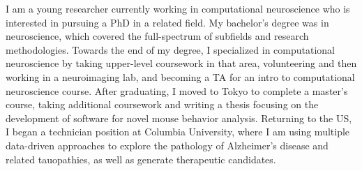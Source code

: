 %
%
%

\vspace*{-0.1cm}

\begin{cvparagraph}
    {I am a young researcher currently working in computational neuroscience who is
        interested in pursuing a PhD in a related field. My bachelor's degree was in
        neuroscience, which covered the full-spectrum of subfields and research
        methodologies. Towards the end of my degree, I specialized in computational
        neuroscience by taking upper-level coursework in that area, volunteering and
        then working in a neuroimaging lab, and becoming a TA for an intro to
        computational neuroscience course. After graduating, I moved to Tokyo to
        complete a master's course, taking additional coursework and writing a thesis
        focusing on the development of software for novel mouse behavior analysis.
        Returning to the US, I began a technician position at Columbia University,
        where I am using multiple data-driven approaches to explore the pathology of
        Alzheimer's disease and related tauopathies, as well as generate therapeutic
        candidates.}

\vspace*{-0.5cm}
\end{cvparagraph}
